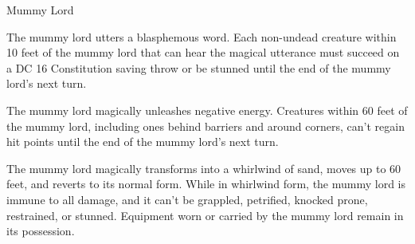 \begin{monsterbox}{Mummy Lord}
\begin{monsteraction}
The mummy lord utters a blasphemous word. Each non-undead creature within 10 feet of the mummy lord that can hear the magical utterance must succeed on a DC 16 Constitution saving throw or be stunned until the end of the mummy lord's next turn.
\end{monsteraction}
\begin{monsteraction}
The mummy lord magically unleashes negative energy. Creatures within 60 feet of the mummy lord, including ones behind barriers and around corners, can't regain hit points until the end of the mummy lord's next turn.
\end{monsteraction}
\begin{monsteraction}
The mummy lord magically transforms into a whirlwind of sand, moves up to 60 feet, and reverts to its normal form. While in whirlwind form, the mummy lord is immune to all damage, and it can't be grappled, petrified, knocked prone, restrained, or stunned. Equipment worn or carried by the mummy lord remain in its possession.
\end{monsteraction}
\end{monsterbox}